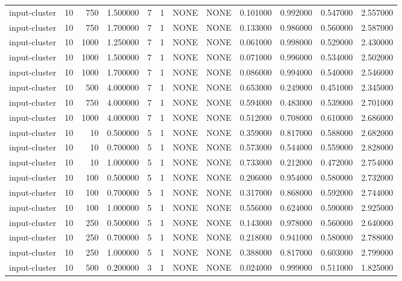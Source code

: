 \begin{tabular}{lrrrllllrrrr}
input-cluster & 10 & 750 & 1.500000 & 7 & 1 & NONE & NONE & 0.101000 & 0.992000 & 0.547000 & 2.557000 \\
input-cluster & 10 & 750 & 1.700000 & 7 & 1 & NONE & NONE & 0.133000 & 0.986000 & 0.560000 & 2.587000 \\
input-cluster & 10 & 1000 & 1.250000 & 7 & 1 & NONE & NONE & 0.061000 & 0.998000 & 0.529000 & 2.430000 \\
input-cluster & 10 & 1000 & 1.500000 & 7 & 1 & NONE & NONE & 0.071000 & 0.996000 & 0.534000 & 2.502000 \\
input-cluster & 10 & 1000 & 1.700000 & 7 & 1 & NONE & NONE & 0.086000 & 0.994000 & 0.540000 & 2.546000 \\
input-cluster & 10 & 500 & 4.000000 & 7 & 1 & NONE & NONE & 0.653000 & 0.249000 & 0.451000 & 2.345000 \\
input-cluster & 10 & 750 & 4.000000 & 7 & 1 & NONE & NONE & 0.594000 & 0.483000 & 0.539000 & 2.701000 \\
input-cluster & 10 & 1000 & 4.000000 & 7 & 1 & NONE & NONE & 0.512000 & 0.708000 & 0.610000 & 2.686000 \\
input-cluster & 10 & 10 & 0.500000 & 5 & 1 & NONE & NONE & 0.359000 & 0.817000 & 0.588000 & 2.682000 \\
input-cluster & 10 & 10 & 0.700000 & 5 & 1 & NONE & NONE & 0.573000 & 0.544000 & 0.559000 & 2.828000 \\
input-cluster & 10 & 10 & 1.000000 & 5 & 1 & NONE & NONE & 0.733000 & 0.212000 & 0.472000 & 2.754000 \\
input-cluster & 10 & 100 & 0.500000 & 5 & 1 & NONE & NONE & 0.206000 & 0.954000 & 0.580000 & 2.732000 \\
input-cluster & 10 & 100 & 0.700000 & 5 & 1 & NONE & NONE & 0.317000 & 0.868000 & 0.592000 & 2.744000 \\
input-cluster & 10 & 100 & 1.000000 & 5 & 1 & NONE & NONE & 0.556000 & 0.624000 & 0.590000 & 2.925000 \\
input-cluster & 10 & 250 & 0.500000 & 5 & 1 & NONE & NONE & 0.143000 & 0.978000 & 0.560000 & 2.640000 \\
input-cluster & 10 & 250 & 0.700000 & 5 & 1 & NONE & NONE & 0.218000 & 0.941000 & 0.580000 & 2.788000 \\
input-cluster & 10 & 250 & 1.000000 & 5 & 1 & NONE & NONE & 0.388000 & 0.817000 & 0.603000 & 2.799000 \\
input-cluster & 10 & 500 & 0.200000 & 3 & 1 & NONE & NONE & 0.024000 & 0.999000 & 0.511000 & 1.825000 \\

\end{tabular}

